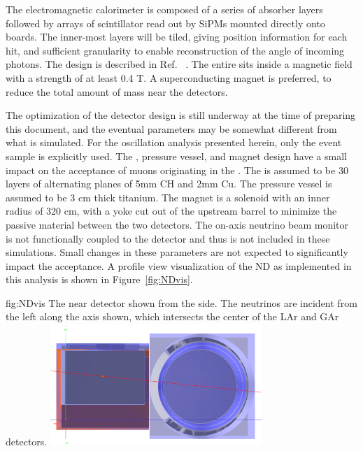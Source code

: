 The electromagnetic calorimeter is composed of a series of absorber layers followed by arrays of scintillator read out by SiPMs mounted directly onto boards. The inner-most layers will be tiled, giving \threed position information for each hit, and sufficient granularity to enable reconstruction of the angle of incoming photons. The  design is described in Ref. ~\cite{Emberger:2018pgr}. The entire  sits inside a magnetic field with a strength of at least 0.4 T. A superconducting magnet is preferred, to reduce the total amount of mass near the detectors.

The optimization of the detector design is still underway at the time of preparing this document, and the eventual parameters may be somewhat different from what is simulated. For the oscillation analysis presented herein, only the  event sample is explicitly used. The , pressure vessel, and magnet design have a small impact on the acceptance of muons originating in the . The  is assumed to be 30 layers of alternating planes of 5mm CH and 2mm Cu. The pressure vessel is assumed to be 3 cm thick titanium. The magnet is a solenoid with an inner radius of 320 cm, with a yoke cut out of the upstream barrel to minimize the passive material between the two  detectors. 
%
The on-axis neutrino beam monitor 
%
is not functionally coupled to the  detector and thus is not included in these simulations. Small changes in these parameters are not expected to significantly impact the acceptance. A profile view visualization of the ND as implemented in this analysis is shown in Figure~\ref{fig:NDvis}.


\begin{dunefigure}[ND visualization]{fig:NDvis}
{The near detector shown from the side. The neutrinos are incident from the left along the axis shown, which intersects the center of the LAr and GAr detectors.}
 \includegraphics[width=0.6\textwidth]{graphics/lar_mpt_in_hall.png}
\end{dunefigure}


